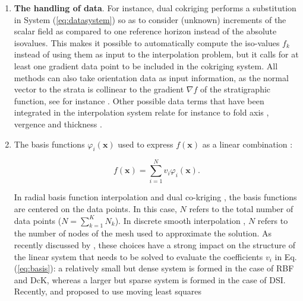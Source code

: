 \documentclass[preprint]{elsarticle}
\begin{document}
\begin{enumerate}
\item \textbf{The handling of data}. For instance, dual cokriging \citep[DcK, ][]{Lajaunie1997MG,Chiles04OMSMP,Calcagno2008PEPI} performs a substitution in System (\ref{eq:datasystem}) so as to consider (unknown) increments of the scalar field as compared to one reference horizon instead of the absolute isovalues. This makes it possible to automatically compute the iso-values $f_k$ instead of using them as input to the interpolation problem, but it calls for at least one gradient data point to be included in the cokriging system. All methods can also take orientation data as input information, as the normal vector to the strata is collinear to the gradient $\nabla f$ of the stratigraphic function, see for instance \citet{Frank2007CG,Hillier2014MG}. Other possible data terms that have been integrated in the interpolation system relate for instance to fold axis \citep{MassiotGM2010,Hillier2014MG}, vergence \citep{Laurent2016EaPSL,Grose2017JSG} and thickness \citep{Laurent2016MG}.

\item The basis functions $\varphi_i(\mathbf{x})$ used to express $f(\mathbf{x})$ as a linear combination \citep[e.g., ][]{Renaudeau2019MG,Wellmann2018AiG}: 

\begin{equation}
\label{eq:basis}
  f(\mathbf{x}) = \sum_{i=1}^{N}{v_i\varphi_i(\mathbf{x})}.
\end{equation}

In radial basis function interpolation \citep[RBF, ][]{Cowan2002ASGMEM,Hillier2014MG} and dual co-kriging \citep[][]{Calcagno2008PEPI}, the basis functions are centered on the data points. In this case, $N$ refers to the total number of data points ($N = \sum_{k=1}^{K}{N_k}$). In discrete smooth interpolation \citep[DSI, ][]{Frank2007CG,Caumon2013GaRSITo,Souche20137ECEISE2,Irakarama2018EAGE}, $N$ refers to the number of nodes of the mesh used to approximate the solution. As recently discussed by \citet{Renaudeau2019MG}, these choices have a strong impact on the structure of the linear system that needs to be solved to evaluate the coefficients $v_i$ in Eq. (\ref{eq:basis}): a relatively small but dense system is formed in the case of RBF and DcK, whereas a larger but sparse system is formed in the case of DSI. Recently, \citet{Renaudeau2019MG} and \citet{Manchuk2019C&G} proposed to use moving least squares 


\end{enumerate}
\end{document}
